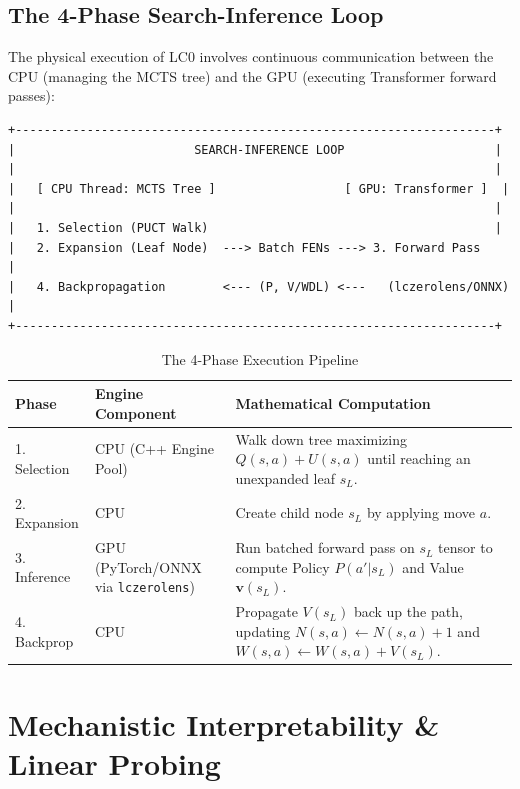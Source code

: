 \documentclass[11pt,a4paper]{report}
\begin{document}
\section{The 4-Phase Search-Inference Loop}
The physical execution of LC0 involves continuous communication between the CPU (managing the MCTS tree) and the GPU (executing Transformer forward passes):

\begin{verbatim}
+-------------------------------------------------------------------+
|                         SEARCH-INFERENCE LOOP                     |
|                                                                   |
|   [ CPU Thread: MCTS Tree ]                  [ GPU: Transformer ]  |
|                                                                   |
|   1. Selection (PUCT Walk)                                        |
|   2. Expansion (Leaf Node)  ---> Batch FENs ---> 3. Forward Pass    |
|   4. Backpropagation        <--- (P, V/WDL) <---   (lczerolens/ONNX)  |
+-------------------------------------------------------------------+
\end{verbatim}

\begin{table}[h!]
\centering
\begin{tabular}{|l|p{5cm}|p{6cm}|}
\hline
\textbf{Phase} & \textbf{Engine Component} & \textbf{Mathematical Computation} \\ \hline
1. Selection & CPU (C++ Engine Pool) & Walk down tree maximizing $Q(s,a) + U(s,a)$ until reaching an unexpanded leaf $s_L$. \\ \hline
2. Expansion & CPU & Create child node $s_L$ by applying move $a$. \\ \hline
3. Inference & GPU (PyTorch/ONNX via \texttt{lczerolens}) & Run batched forward pass on $s_L$ tensor to compute Policy $P(a'|s_L)$ and Value $\mathbf{v}(s_L)$. \\ \hline
4. Backprop & CPU & Propagate $V(s_L)$ back up the path, updating $N(s,a) \leftarrow N(s,a)+1$ and $W(s,a) \leftarrow W(s,a) + V(s_L)$. \\ \hline
\end{tabular}
\caption{The 4-Phase Execution Pipeline}
\end{table}

\newpage
\chapter{Mechanistic Interpretability \& Linear Probing}
\end{document}
